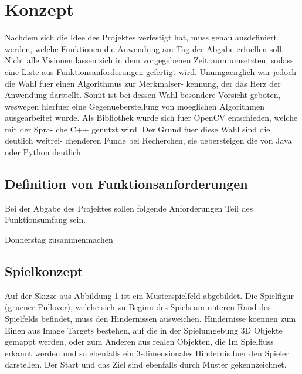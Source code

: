 \chapter{Konzept}
\label{sec:conzept}
Nachdem sich die Idee des Projektes verfestigt hat, muss genau ausdefiniert werden, welche Funktionen die Anwendung am Tag der Abgabe erfuellen soll. Nicht alle Visionen lassen sich in dem vorgegebenen Zeitraum umsetzten, sodass eine Liste aus Funktionsanforderungen gefertigt wird.
Unumgaenglich war jedoch die Wahl fuer einen Algorithmus zur Merkmalser- kennung, der das Herz der Anwendung darstellt. Somit ist bei dessen Wahl besondere Vorsicht geboten, weswegen hierfuer eine Gegenueberstellung von moeglichen Algorithmen ausgearbeitet wurde.
Als Bibliothek wurde sich fuer OpenCV entschieden, welche mit der Spra- che C++ genutzt wird. Der Grund fuer diese Wahl sind die deutlich weitrei- chenderen Funde bei Recherchen, sie uebersteigen die von Java oder Python deutlich.


\section{Definition von Funktionsanforderungen}
Bei der Abgabe des Projektes sollen folgende Anforderungen Teil des Funktionsumfang sein.

Donnerstag zusammenmachen
\section{Spielkonzept}
Auf der Skizze aus Abbildung 1 ist ein Musterspielfeld abgebildet. Die Spielfigur (gruener Pullover), welche sich zu Beginn des Spiels am unteren Rand des Spielfelds befindet, muss den Hindernissen ausweichen. Hindernisse koennen zum Einen aus Image Targets bestehen, auf die in der Spielumgebung 3D Objekte gemappt werden, oder zum Anderen aus realen Objekten, die Im Spielfluss erkannt werden und so ebenfalls ein 3-dimensionales Hindernis fuer den Spieler darstellen. Der Start und das Ziel sind ebenfalls durch Muster gekennzeichnet.
